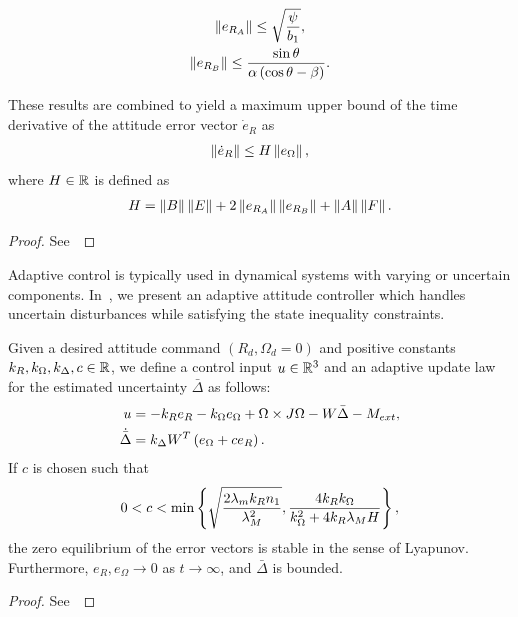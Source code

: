 \begin{prop}
\begin{enumerate}
        \begin{gather}
            \left\| e_{R_A} \right\| \leq \sqrt{\frac{\psi}{b_1}}, \label{eqn:eRA_bound} \\
            \left\| e_{R_B} \right\| \leq \frac{\sin\theta}{\alpha \left( \cos \theta - \beta \right)}. \label{eqn:eRB_bound}
        \end{gather}
\end{enumerate}
These results are combined to yield a maximum upper bound of the time derivative of the attitude error vector \( \dot{e}_R \) as
\begin{gather}
	\left\| \dot{e}_R \right\| \leq H \left\| e_\Omega \right\| ,\label{eqn:eR_bound}
\end{gather}
where  \( H \in \mathbb{R} \) is defined as
\begin{gather}
	H = \left\| B \right\| \left\| E \right\| + 2 \left\| e_{R_A} \right\| \left\| e_{R_B} \right\| + \left\| A \right\|\left\| F \right\|. \label{eqn:H}
\end{gather}
\end{prop}
\begin{proof}
See~
\end{proof}

Adaptive control is typically used in dynamical systems with varying or uncertain components.
In~, we present an adaptive attitude controller which handles uncertain disturbances while satisfying the state inequality constraints.
\begin{prop}\label{prop:adaptive_control}
Given  a desired attitude command \( (R_d, \Omega_d = 0 )\) and positive constants \( k_R, k_\Omega, k_\Delta, c \in \mathbb{R} \), we define a control input \( u \in \mathbb{R}^3\) and an adaptive update law for the estimated uncertainty \( \bar{\Delta} \) as follows:
\begin{align}
    u &= - k_R e_R - k_\Omega e_\Omega + \Omega \times J \Omega - W \bar{\Delta} - M_{ext} , \label{eqn:adaptive_control} \\
	\dot{\bar{\Delta}} &= k_\Delta W^T \left( e_\Omega + c e_R \right) . \label{eqn:delta_dot}
\end{align}
If \( c \) is chosen such that
\begin{gather}
	0 < c < \min \left\{ \sqrt{\frac{2 \lambda_m k_R n_1}{\lambda_M^2}},
	\frac{4 k_R k_\Omega}{k_\Omega^2 + 4 k_R \lambda_M H} \right\} , \label{eqn:c_bound}
\end{gather}
  the zero equilibrium of the error vectors is stable in the sense of Lyapunov. Furthermore, $e_R,e_\Omega\rightarrow 0$ as $t\rightarrow\infty$, and $\bar\Delta$ is  bounded.
\end{prop}
\begin{proof}
See~
\end{proof}


